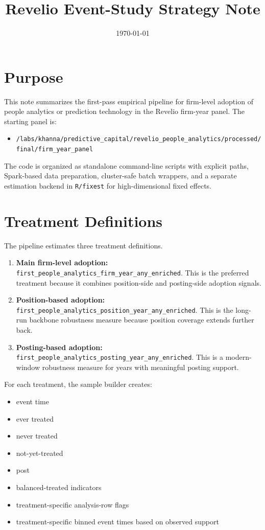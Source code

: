 \documentclass[11pt]{article}
\title{Revelio Event-Study Strategy Note}
\author{}
\date{\today}
\begin{document}
\maketitle

\section{Purpose}

This note summarizes the first-pass empirical pipeline for firm-level adoption of people analytics or prediction technology in the Revelio firm-year panel. The starting panel is:

\begin{itemize}[leftmargin=1.5em]
    \item \texttt{/labs/khanna/predictive\_capital/revelio\_people\_analytics/processed/final/firm\_year\_panel}
\end{itemize}

The code is organized as standalone command-line scripts with explicit paths, Spark-based data preparation, cluster-safe batch wrappers, and a separate estimation backend in \texttt{R/fixest} for high-dimensional fixed effects.

\section{Treatment Definitions}

The pipeline estimates three treatment definitions.

\begin{enumerate}[leftmargin=1.5em]
    \item \textbf{Main firm-level adoption:} \texttt{first\_people\_analytics\_firm\_year\_any\_enriched}. This is the preferred treatment because it combines position-side and posting-side adoption signals.
    \item \textbf{Position-based adoption:} \texttt{first\_people\_analytics\_position\_year\_any\_enriched}. This is the long-run backbone robustness measure because position coverage extends further back.
    \item \textbf{Posting-based adoption:} \texttt{first\_people\_analytics\_posting\_year\_any\_enriched}. This is a modern-window robustness measure for years with meaningful posting support.
\end{enumerate}

For each treatment, the sample builder creates:

\begin{itemize}[leftmargin=1.5em]
    \item event time
    \item ever treated
    \item never treated
    \item not-yet-treated
    \item post
    \item balanced-treated indicators
    \item treatment-specific analysis-row flags
    \item treatment-specific binned event times based on observed support
\end{itemize}
\end{document}
